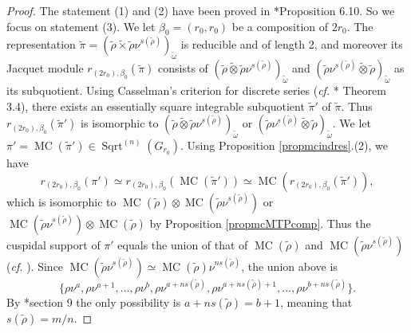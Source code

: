 \documentclass{amsart}
\numberwithin{equation}{section}
\newtheorem{definition}[theorem]{\bf{Definition}}
\newcommand{\mrsqrt}{\operatorname{Sqrt}}
\newcommand{\mrmc}{\operatorname{MC}}
\newcommand{\wt}[1]{\widetilde{#1}}
\begin{document}
	\begin{proof}
		
		The statement (1) and (2) have been proved in \cite{kaplan2022classification}*{Proposition 6.10}. So we focus on statement (3). We let $\beta_{0}=(r_{0},r_{0})$ be a composition of $2r_{0}$. The representation   $\wt{\pi}=(\wt{\rho}\wt{\times}\wt{\rho}\nu^{s(\wt{\rho})})_{\wt{\omega}}$ is reducible and of length 2, and moreover its Jacquet module $r_{(2r_{0}),\beta_{0}}(\wt{\pi})$ consists of $(\wt{\rho}\wt{\otimes}\wt{\rho}\nu^{s(\wt{\rho})})_{\wt{\omega}}$ and $(\wt{\rho}\nu^{s(\wt{\rho})}\wt{\otimes}\wt{\rho})_{\wt{\omega}}$ as its subquotient. Using Casselman's criterion for discrete series (\emph{cf.} \cite{ban2013langlands}*{ Theorem 3.4}), there exists an essentially square integrable subquotient $\wt{\pi}'$ of $\wt{\pi}$. Thus $r_{(2r_{0}),\beta_{0}}(\wt{\pi}')$ is isomorphic to $(\wt{\rho}\wt{\otimes}\wt{\rho}\nu^{s(\wt{\rho})})_{\wt{\omega}}$ or $(\wt{\rho}\nu^{s(\wt{\rho})}\wt{\otimes}\wt{\rho})_{\wt{\omega}}$. We let $\pi'=\mrmc(\wt{\pi}')\in\mrsqrt^{(n)}(G_{r_{0}})$. Using Proposition \ref{propmcindres}.(2), we have $$r_{(2r_{0}),\beta_{0}}(\pi')\simeq r_{(2r_{0}),\beta_{0}}(\mrmc(\wt{\pi}'))\simeq\mrmc(r_{(2r_{0}),\beta_{0}}(\wt{\pi}')),$$
		which is isomorphic to  $\mrmc(\wt{\rho})\otimes\mrmc(\wt{\rho}\nu^{s(\wt{\rho})})$ or  $\mrmc(\wt{\rho}\nu^{s(\wt{\rho})})\otimes\mrmc(\wt{\rho})$ by Proposition \ref{propmcMTPcomp}.
		Thus the cuspidal support of $\pi'$  equals the union of that of $\mrmc(\wt{\rho})$ and $\mrmc(\wt{\rho}\nu^{s(\wt{\rho})})$ (\emph{cf.} \cite{zelevinsky1980induced}). Since $\mrmc(\wt{\rho}\nu^{s(\wt{\rho})})\simeq \mrmc(\wt{\rho})\nu^{ns(\wt{\rho})}$, the union above is $$\{\rho\nu^{a},\rho\nu^{a+1},\dots,\rho\nu^{b},\rho\nu^{a+ns(\wt{\rho})},\rho\nu^{a+ns(\wt{\rho})+1},\dots,\rho\nu^{b+ns(\wt{\rho})}\}.$$ By \cite{zelevinsky1980induced}*{section 9} the only possibility is $a+ns(\wt{\rho})=b+1$, meaning that $s(\wt{\rho})=m/n$.
		
	\end{proof}
	
	
	
	
\end{document}
